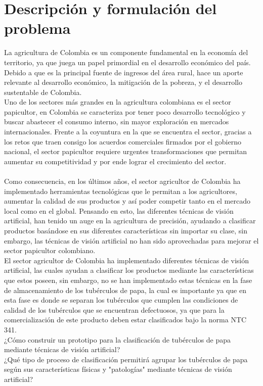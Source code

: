 \section{Descripción y formulación del problema}
La agricultura de Colombia es un componente fundamental en la economía del territorio, ya que juega un papel primordial en el desarrollo económico del país. Debido a que es la principal fuente de ingresos del área rural, hace un aporte relevante al desarrollo económico, la mitigación de la pobreza, y el desarrollo sustentable de Colombia.
\\
Uno de los sectores más grandes en la agricultura colombiana es el sector papicultor, en Colombia se caracteriza por tener poco desarrollo tecnológico y buscar abastecer el consumo interno, sin mayor exploración en mercados internacionales. Frente a la coyuntura en la que se encuentra el sector, gracias a los retos que traen consigo los acuerdos comerciales firmados por el gobierno nacional, el sector papicultor requiere urgentes transformaciones que permitan aumentar su competitividad y por ende lograr el crecimiento del sector.
\\
\\
Como consecuencia, en los últimos años, el sector agricultor de Colombia ha implementado herramientas tecnológicas que le permitan a los agricultores, aumentar la calidad de sus productos y así poder competir tanto en el mercado local como en el global. Pensando en esto, las diferentes técnicas de visión artificial, han tenido un auge en la agricultura de precisión, ayudando a clasificar productos basándose en sus diferentes características sin importar su clase, sin embargo, las técnicas de visión artificial no han sido aprovechadas para mejorar el sector papicultor colombiano.
\\
El sector agricultor de Colombia ha implementado diferentes técnicas de visión artificial, las cuales ayudan a clasificar los productos mediante las características que estos poseen, sin embargo, no se han implementado estas técnicas en la fase de almacenamiento de los tubérculos de papa, la cual es importante ya que en esta fase es donde se separan los tubérculos que cumplen las condiciones de calidad de los tubérculos que se encuentran defectuosos, ya que para la comercialización de este producto deben estar clasificados bajo la norma NTC 341.
\\ 
¿Cómo construir un prototipo para la clasificación de tubérculos de papa mediante técnicas de visión artificial?
\\
¿Qué tipo de proceso de clasificación permitirá agrupar los tubérculos de papa según sus características físicas y "patologías" mediante técnicas de visión artificial?	


